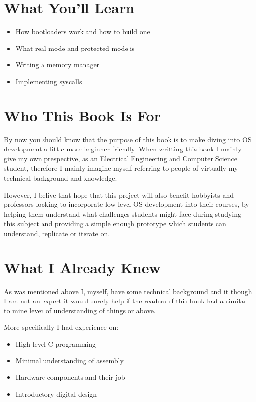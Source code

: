 \section{What You'll Learn}

\begin{itemize}
  \item How bootloaders work and how to build one
  \item What real mode and protected mode is
  \item Writing a memory manager
  \item Implementing syscalls
\end{itemize}

\section{Who This Book Is For}

By now you should know that the purpose of this book is to make diving into OS development a little more beginner friendly.
When writting this book I mainly give my own prespective, as an Electrical Engineering and Computer Science student, therefore
I mainly imagine myself referring to people of virtually my technical background and knowledge. 

However, I belive that hope that this project will also benefit hobbyists and professors looking to incorporate low-level
OS development into their courses, by helping them understand what challenges students might face during studying this
subject and providing a simple enough prototype which students can understand, replicate or iterate on.

\section{What I Already Knew}

As was mentioned above I, myself, have some technical background and it though I am not an expert it would surely help
if the readers of this book had a similar to mine lever of understanding of things or above.

More specifically I had experience on:
\begin{itemize}
    \item High-level C programming
    \item Minimal understanding of assembly
    \item Hardware components and their job
    \item Introductory digital design
  \end{itemize}

